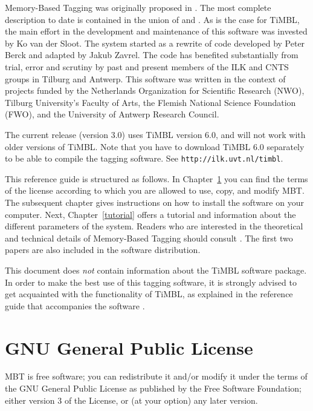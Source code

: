 \documentclass{report}
\begin{document}
Memory-Based Tagging was originally proposed in
\cite{Daelemans95}. The most complete description to date is contained
in the union of \cite{Daelemans+96} and \cite{Zavrel+99}.  As is the
case for TiMBL, the main effort in the development and
maintenance of this software was invested by Ko van der Sloot. The
system started as a rewrite of code developed by Peter Berck and
adapted by Jakub Zavrel. The code has benefited substantially from
trial, error and scrutiny by past and present members of the ILK
and CNTS groups in Tilburg and Antwerp. This software was
written in the context of projects funded by the Netherlands
Organization for Scientific Research (NWO), Tilburg University's Faculty
of Arts, the Flemish National Science Foundation (FWO), and the
University of Antwerp Research Council.

The current release (version 3.0) uses TiMBL version 6.0, and will not
work with older versions of TiMBL. Note that you have to download
TiMBL 6.0 separately to be able to compile the tagging software. See
{\tt http://ilk.uvt.nl/timbl}.

This reference guide is structured as follows. In
Chapter~\ref{license} you can find the terms of the license according
to which you are allowed to use, copy, and modify MBT. The subsequent
chapter gives instructions on how to install the software on your
computer.  Next, Chapter~\ref{tutorial} offers a tutorial and
information about the different parameters of the system.  Readers who
are interested in the theoretical and technical details of
Memory-Based Tagging should consult
\cite{Daelemans+96,Zavrel+99,Daelemans+05}. The first two papers are
also included in the software distribution.

This document does {\em not}\/ contain information about the TiMBL
software package. In order to make the best use of this tagging
software, it is strongly advised to get acquainted with the
functionality of TiMBL, as explained in the reference guide that
accompanies the software \cite{Daelemans+07}.

\chapter{GNU General Public License}
\label{license}

MBT is free software; you can redistribute it and/or modify it under
the terms of the GNU General Public License as published by the Free
Software Foundation; either version 3 of the License, or (at your
option) any later version.
\end{document}
